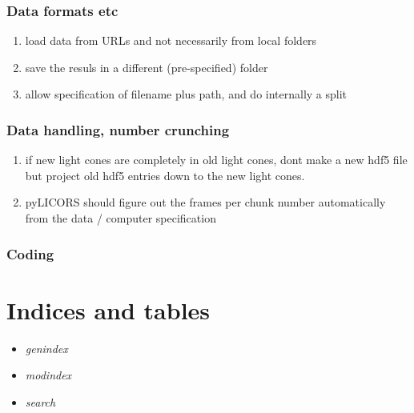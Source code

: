 \documentclass[letterpaper,10pt,english]{sphinxmanual}
\begin{document}
\subsection{Data formats etc}
\label{TODO:data-formats-etc}\begin{enumerate}
\item {} 
load data from URLs and not necessarily from local folders

\item {} 
save the resuls in a different (pre-specified) folder

\item {} 
allow specification of filename plus path, and do internally a split

\end{enumerate}


\subsection{Data handling, number crunching}
\label{TODO:data-handling-number-crunching}\begin{enumerate}
\item {} 
if new light cones are completely in old light cones, dont make a new hdf5 file but project
old hdf5 entries down to the new light cones.

\item {} 
pyLICORS should figure out the frames per chunk number automatically from the data / computer specification

\end{enumerate}


\subsection{Coding}
\label{TODO:coding}

\chapter{Indices and tables}
\label{index:indices-and-tables}\begin{itemize}
\item {} 
\emph{genindex}

\item {} 
\emph{modindex}

\item {} 
\emph{search}

\end{itemize}



\renewcommand{\indexname}{Index}
\printindex
\end{document}
